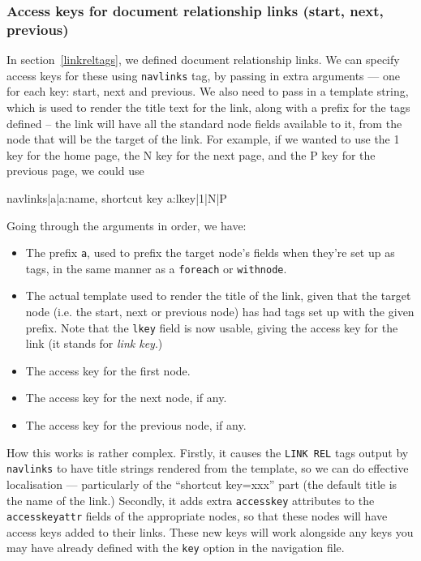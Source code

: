 \subsubsection{Access keys for document relationship links (start, next, previous)}
In section~\ref{linkreltags}, we defined document relationship links. We can specify
access keys for these using \texttt{navlinks} tag, by passing in extra arguments --- one for
each key: start, next and previous. We also need to pass in a template
string, which is used to render the title text for the link, along with a prefix for the 
tags defined -- the link will have all the standard node fields available to it, from the node
that will be the target of the link.
For example, if we wanted to use the 1 key for the home
page, the N key for the next page, and the P key for the previous page, we could use
\begin{MyVerbatim}
{{navlinks|a|{{a:name}}, shortcut key {{a:lkey}}|1|N|P}}
\end{MyVerbatim}
Going through the arguments in order, we have:
\begin{itemize}
\item The prefix \texttt{a}, used to prefix the target node's fields when they're set up as tags,
in the same manner as a \texttt{foreach} or \texttt{withnode}.
\item The actual template used to render the title of the link, given that the target node (i.e. the 
start, next or previous node) has had tags set up with the given prefix. Note that the \texttt{lkey}
field is now usable, giving the access key for the link (it stands for \emph{link key}.)
\item The access key for the first node.
\item The access key for the next node, if any.
\item The access key for the previous node, if any.
\end{itemize}
How this works is rather complex. Firstly, it causes the \texttt{LINK REL} tags output by \texttt{navlinks}
to have title strings rendered from the template, so we can do effective localisation --- particularly
of the ``shortcut key=xxx'' part (the default title is the name of the link.)
Secondly, it adds extra \texttt{accesskey} attributes to the 
\texttt{accesskeyattr} fields of the appropriate nodes, so that these nodes will have access keys
added to their links. These new keys will work alongside any keys you may have already defined with
the \texttt{key} option in the navigation file.

